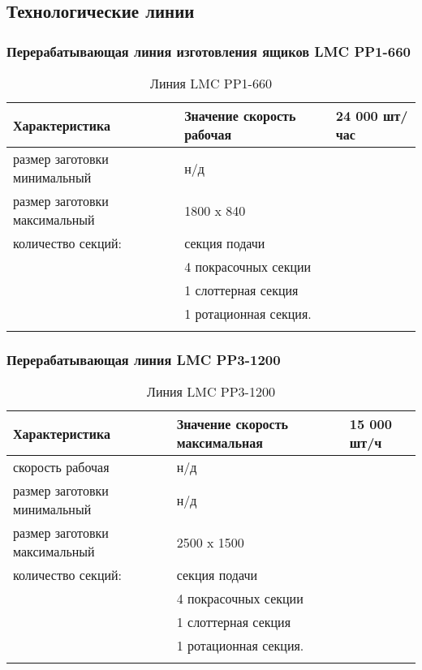 \subsection{Технологические линии}

\subsubsection{Перерабатывающая линия изготовления ящиков LMC PP1-660}
\begin{longtable}{|p{10cm}|p{5cm}|}
    \hline
	\textbf{Характеристика} & \textbf{Значение}
	\endhead
  	\hline 
скорость рабочая                         	& 24 000 шт/час\\
  	\hline 
размер заготовки минимальный  	& н/д  \\	
  	\hline 
  	размер заготовки максимальный   & 1800 x 840  \\
  	\hline 
количество секций:    	& секция подачи\\
& 4 покрасочных секции \\
& 1 слоттерная секция\\
& 1 ротационная секция.\\
\hline 
  \caption{Линия LMC PP1-660}\label{tab:line1}
\end{longtable}


\subsubsection{Перерабатывающая линия LMC PP3-1200}
\begin{longtable}{|p{10cm}|p{5cm}|}
    \hline
	\textbf{Характеристика} & \textbf{Значение}
	\endhead
 	\hline
 скорость максимальная       	 & 15 000 шт/ч\\
  	\hline 
скорость рабочая                         	&  н/д \\
  	\hline 
размер заготовки минимальный  	& н/д   \\	
  	\hline 
  	размер заготовки максимальный   & 2500 x 1500  \\
  	\hline 
количество секций:    	& секция подачи\\
& 4 покрасочных секции \\
& 1 слоттерная секция\\
& 1 ротационная секция.\\
\hline 
  \caption{Линия LMC PP3-1200}\label{tab:line2}
\end{longtable}



